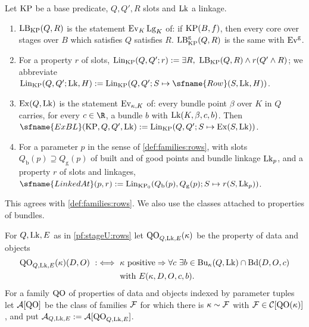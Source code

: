 \begin{definition}\label{pf:stageU:linked}
Let $\mathrm{KP}$ be a base predicate, $Q,Q',R$ slots and $\mathrm{Lk}$ a linkage.
\begin{enumerate}[label=(\alph*)]
\item $\mathrm{LB}_{\mathrm{KP}}(Q,R)$ is the statement $\mathrm{Ev}_K\,\mathrm{Lg}_K$ of: if $\mathrm{KP}(B,f)$, then every core over
stages over $B$ which satisfies $Q$ satisfies $R$. $\mathrm{LB}^{\mathrm g}_{\mathrm{KP}}(Q,R)$ is the same with
$\mathrm{Ev}^{\mathrm g}$.
\item For a property $r$ of slots, $\stageULin_{\stageUKP}(Q,Q';r):=\exists R,\ \stageULB_{\stageUKP}(Q,R)\wedge r(Q'\stageUand R)$;
we abbreviate $\stageULin_{\stageUKP}(Q,Q';\stageULk,H):=\stageULin_{\stageUKP}(Q,Q';S\mapsto\sfname{Row}(S,\stageULk,H))$.
\item $\mathrm{Ex}(Q,\mathrm{Lk})$ is the statement $\mathrm{Ev}_{\kappa,K}$ of: every bundle point $\beta$ over $K$ in $Q$
carries, for every $c\in\R$, a bundle $b$ with $\mathrm{Lk}(K,\beta,c,b)$. Then
$\sfname{ExBL}(\stageUKP,Q,Q',\stageULk):=\stageULin_{\stageUKP}(Q,Q';S\mapsto\stageUEx(S,\stageULk))$.
\item For a parameter $p$ in the sense of \cref{def:families:rows}, with slots $Q_{\mathrm b}(p)\supseteq Q_{\mathrm g}(p)$
of built and of good points and bundle linkage $\mathrm{Lk}_p$, and a property $r$ of slots and linkages,
$\sfname{LinkedAt}(p,r):=\stageULin_{\stageUKP_0}(Q_{\mathrm b}(p),Q_{\mathrm g}(p);S\mapsto r(S,\stageULk_p))$.
\end{enumerate}
\end{definition}

This agrees with \cref{def:families:rows}. We also use the classes attached to properties of bundles.

\begin{definition}\label{pf:stageU:classes}
For $Q,\mathrm{Lk},E$ as in \cref{pf:stageU:rows} let $\mathrm{QO}_{Q,\mathrm{Lk},E}(\kappa)$ be the property of data and objects
\[
\begin{aligned}
\mathrm{QO}_{Q,\mathrm{Lk},E}(\kappa)(D,O)\ :\iff\ &\kappa\text{ positive}\Rightarrow\forall c\ \exists b\in
\mathrm{Bu}_\kappa(Q,\mathrm{Lk})\cap\mathrm{Bd}(D,O,c)\\
&\text{with }E(\kappa,D,O,c,b).
\end{aligned}
\]
For a family $\mathrm{QO}$ of properties of data and objects indexed by parameter tuples let $\mathcal{A}[\mathrm{QO}]$ be the
class of families $\mathcal{F}$ for which there is $\kappa\sim\mathcal{F}$ with $\mathcal{F}\in\mathcal{C}[\mathrm{QO}(\kappa)]$, and put
$\mathcal{A}_{Q,\mathrm{Lk},E}:=\mathcal{A}[\mathrm{QO}_{Q,\mathrm{Lk},E}]$.
\end{definition}

